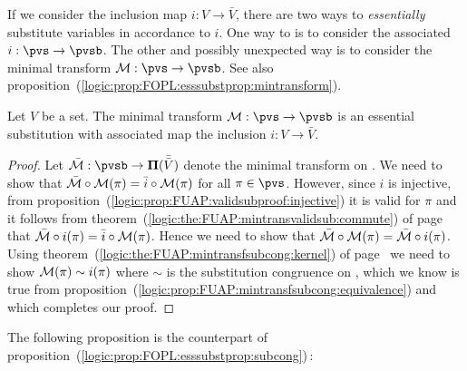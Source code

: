 If we consider the inclusion map $i:V\to\bar{V}$, there are two ways
to {\em essentially} substitute variables in accordance to $i$. One
way to is to consider the associated $i:\pvs\to\pvsb$. The other and
possibly unexpected way is to consider the minimal transform ${\cal
M}:\pvs\to\pvsb$. See also
proposition~(\ref{logic:prop:FOPL:esssubstprop:mintransform}).

\begin{prop}\label{logic:prop:FUAP:esssubstprop:mintransform}
Let $V$ be a set. The minimal transform ${\cal M}:\pvs\to\pvsb$ is
an essential substitution with associated map the inclusion
$i:V\to\bar{V}$.
\end{prop}
\begin{proof}
Let $\bar{\cal M}:\pvsb\to{\bf\Pi}(\bar{\bar{V}})$ denote the
minimal transform on \pvsb. We need to show that $\bar{\cal
M}\circ{\cal M}(\pi)=\bar{i}\circ{\cal M}(\pi)$ for all
$\pi\in\pvs$. However, since $i$ is injective, from
proposition~(\ref{logic:prop:FUAP:validsubproof:injective}) it is
valid for $\pi$ and it follows from
theorem~(\ref{logic:the:FUAP:mintransvalidsub:commute}) of
page~\pageref{logic:the:FUAP:mintransvalidsub:commute} that
$\bar{\cal M}\circ i(\pi)=\bar{i}\circ{\cal M}(\pi)$. Hence we need
to show that $\bar{\cal M}\circ{\cal M}(\pi)=\bar{\cal M}\circ
i(\pi)$. Using
theorem~(\ref{logic:the:FUAP:mintransfsubcong:kernel}) of
page~\pageref{logic:the:FUAP:mintransfsubcong:kernel} we need to
show ${\cal M}(\pi)\sim i(\pi)$ where $\sim$ is the substitution
congruence on \pvsb, which we know is true from
proposition~(\ref{logic:prop:FUAP:mintransfsubcong:equivalence}) and
which completes our proof.
\end{proof}

The following proposition is the counterpart of
proposition~(\ref{logic:prop:FOPL:esssubstprop:subcong})\,:

